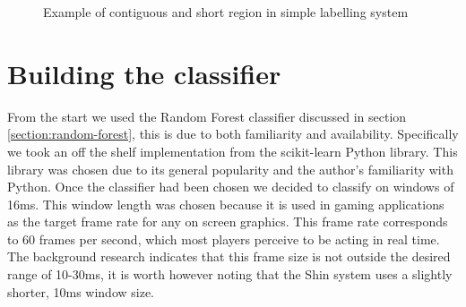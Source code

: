 \documentclass[ %
                    author={Sam Phippen},
                supervisor={Dr. Rafal Bogacz},
                     title={Real time voice activity detectors in noisy personal computing environments},
                  subtitle={},
                    degree={MEng},
                      year={2012} ]{thesis}
\begin{document}
\begin{figure}
    \caption{Example of contiguous and short region in simple labelling system}
    \label{img:labelling_example}
\end{figure}

\section{Building the classifier}

From the start we used the Random Forest classifier discussed in section
\ref{section:random-forest}, this is due to both familiarity and availability.
Specifically we took an off the shelf implementation from the
scikit-learn\cite{sklearn} Python library. This library was chosen due to its
general popularity and the author's familiarity with Python. Once the
classifier had been chosen we decided to classify on windows of 16ms. This
window length was chosen because it is used in gaming applications as the
target frame rate for any on screen graphics. This frame rate corresponds to 60
frames per second, which most players perceive to be acting in real time. The
background research indicates that this frame size is not outside the desired
range of 10-30ms, it is worth however noting that the Shin\cite{shin} system
uses a slightly shorter, 10ms window size.
\end{document}
